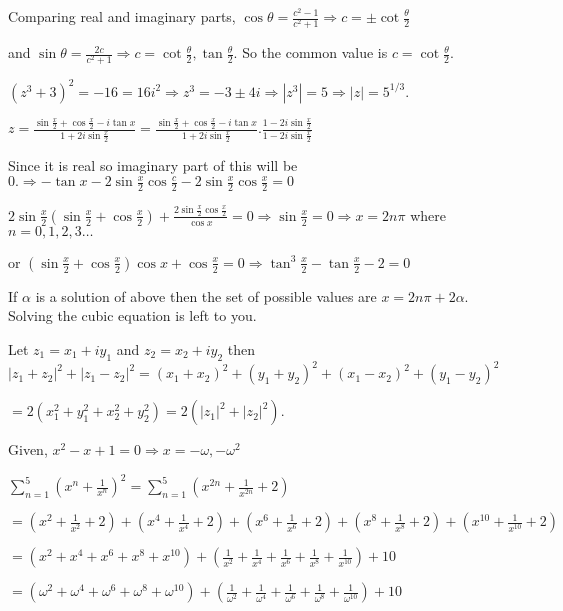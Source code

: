   Comparing real and imaginary parts, $\cos\theta = \frac{c^2 - 1}{c^2 + 1} \Rightarrow c =
  \pm\cot\frac{\theta}{2}$

  and $\sin\theta = \frac{2c}{c^2 + 1} \Rightarrow c = \cot\frac{\theta}{2}, \tan\frac{\theta}{2}$. So the
  common value is $c = \cot\frac{\theta}{2}$.
\item $(z^3 + 3)^2 = -16 = 16i^2 \Rightarrow z^3 = -3 \pm 4i\Rightarrow |z^3| = 5 \Rightarrow |z| =
  5^{1/3}$.
\item $z = \frac{\sin\frac{x}{2} + \cos\frac{x}{2} - i\tan x}{1 + 2i\sin\frac{x}{2}}= \frac{\sin\frac{x}{2}
  + \cos\frac{x}{2} - i\tan x}{1 + 2i\sin\frac{x}{2}}.\frac{1 - 2i\sin\frac{x}{2}}{1 - 2i\sin\frac{x}{2}}$

  Since it is real so imaginary part of this will be $0.\Rightarrow -\tan x -2\sin\frac{x}{2}\cos\frac{c}{2}
  -2\sin\frac{x}{2}\cos\frac{x}{2} = 0$

  $2\sin\frac{x}{2}\left(\sin\frac{x}{2} + \cos\frac{x}{2}\right) +
  \frac{2\sin\frac{x}{2}\cos\frac{x}{2}}{\cos x} = 0\Rightarrow \sin\frac{x}{2} = 0 \Rightarrow x = 2n\pi$
  where $n = 0,1,2,3\ldots$

  or $\left(\sin\frac{x}{2} + \cos\frac{x}{2}\right)\cos x + \cos\frac{x}{2} = 0\Rightarrow
  \tan^3\frac{x}{2} - \tan\frac{x}{2} - 2 = 0$

  If $\alpha$ is a solution of above then the set of possible values are $x = 2n\pi + 2\alpha$. Solving the
  cubic equation is left to you.
\item Let $z_1 = x_1 + iy_1$ and $z_2 = x_2 + iy_2$ then $|z_1 + z_2|^2 + |z_1 - z_2|^2 = (x_1 + x_2)^2 +
  (y_1 + y_2)^2 + (x_1 - x_2)^2 + (y_1 - y_2)^2$

  $= 2(x_1^2 + y_1^2 + x_2^2 + y_2^2) = 2(|z_1|^2 + |z_2|^2)$.
\item Given, $x^2 - x + 1 = 0\Rightarrow x = -\omega, -\omega^2$

  $\displaystyle\sum_{n = 1}^5\left(x^n + \frac{1}{x^n}\right)^2 = \sum_{n = 1}^5\left(x^{2n} +
  \frac{1}{x^{2n}} + 2\right)$

  $= \left(x^2 + \frac{1}{x^2} + 2\right) + \left(x^4 + \frac{1}{x^4} + 2\right) + \left(x^6 + \frac{1}{x^6}
  + 2\right) + \left(x^8 + \frac{1}{x^8} + 2\right) + \left(x^{10} + \frac{1}{x^{10}} + 2\right)$

  $= (x^2 + x^4 + x^6 + x^8 + x^{10}) + \left(\frac{1}{x^2} + \frac{1}{x^4} + \frac{1}{x^6} + \frac{1}{x^8}
  + \frac{1}{x^{10}}\right) + 10$

  $= (\omega^2 + \omega^4 + \omega^6 + \omega^8 + \omega^{10}) + \left(\frac{1}{\omega^2} +
  \frac{1}{\omega^4} + \frac{1}{\omega^6} + \frac{1}{\omega^8} + \frac{1}{\omega^{10}}\right) + 10$

